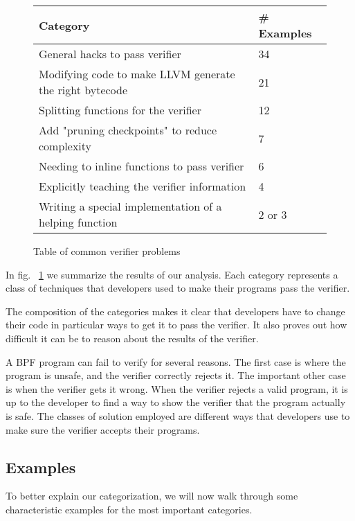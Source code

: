 \begin{figure}
    \centering
    \begin{tabular}{|p{5cm}|p{2cm}|}
        \hline
        Category & \# Examples \\
        \hline
        General hacks to pass verifier & 34 \\
        \hline
        Modifying code to make LLVM generate the right bytecode & 21 \\
        \hline
        Splitting functions for the verifier & 12 \\
        \hline
        Add "pruning checkpoints" to reduce complexity & 7 \\
        \hline
        Needing to inline functions to pass verifier & 6 \\
        \hline
        Explicitly teaching the verifier information & 4 \\
        \hline
        Writing a special implementation of a helping function & 2 or 3 \\
        \hline
    \end{tabular}
    \caption{Table of common verifier problems}
    \label{fig:commit-table}
\end{figure}

In fig. ~\ref{fig:commit-table} we summarize the results of our analysis.
Each category represents a class of techniques that developers used to make their programs pass the verifier.

The composition of the categories makes it clear that developers have to change their code in particular ways to get it to pass the verifier.
It also proves out how difficult it can be to reason about the results of the verifier.

A BPF program can fail to verify for several reasons.
The first case is where the program is unsafe, and the verifier correctly rejects it.
The important other case is when the verifier gets it wrong.
When the verifier rejects a valid program, it is up to the developer to find a way to show the verifier that the program actually is safe.
The classes of solution employed are different ways that developers use to make sure the verifier accepts their programs.

\subsection{Examples}
To better explain our categorization, we will now walk through some characteristic examples for the most important categories.

